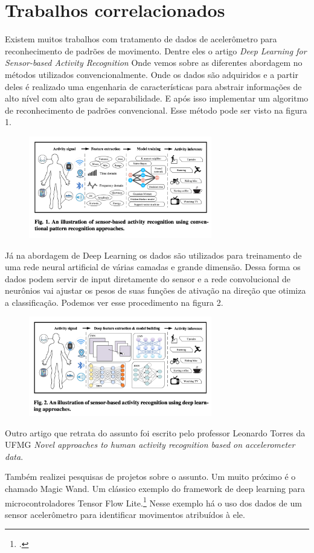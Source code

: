 \section{Trabalhos correlacionados}

Existem muitos trabalhos com tratamento de dados de acelerômetro para reconhecimento
de padrões de movimento.
 Dentre eles o artigo \emph{Deep Learning for Sensor-based Activity Recognition}\cite*[]{DeepLearningSensorBasedActivitie}
Onde vemos sobre as diferentes abordagem no métodos utilizados convencionalmente. Onde os dados são adquiridos e a partir
deles é realizado uma engenharia de características para abstrair informações de alto nível com alto grau de separabilidade.
E após isso implementar um algoritmo de reconhecimento de padrões convencional. Esse método pode ser visto na figura 1.

\begin{figure}[H]
    \center
    \includegraphics[width=8cm]{images/conventional}
\end{figure}

Já na abordagem de Deep Learning os dados são utilizados para treinamento de uma rede neural artificial de várias camadas e grande dimensão.
Dessa forma os dados podem servir de input diretamente do sensor e a rede convolucional de neurônios vai ajustar os pesos de suas funções de ativação
na direção que otimiza a classificação. Podemos ver esse procedimento na figura 2.

\begin{figure}[H]
    \center
    \includegraphics[width=8cm]{images/deeplearning}
\end{figure}



Outro artigo que retrata do assunto foi escrito pelo professor Leonardo Torres da UFMG \emph{Novel approaches to human activity recognition based on accelerometer data}\cite*[]{HumanRecognitionLeonardoTorres}.


Também realizei pesquisas de projetos sobre o assunto. Um muito próximo é o chamado Magic Wand. Um clássico
exemplo do framework de deep learning para microcontroladores Tensor Flow Lite.\footcite[]{TensorFlow Lite: https://www.tensorflow.org/lite}
Nesse exemplo há o uso dos dados de um sensor acelerômetro para identificar movimentos atribuídos à ele.

